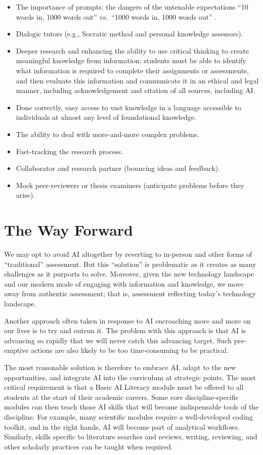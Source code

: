 \documentclass[
  10t,
]{article}
\providecommand{\tightlist}{%
  \setlength{\itemsep}{0pt}\setlength{\parskip}{0pt}}
\begin{document}
\begin{itemize}
\tightlist
\item
  The importance of prompts: the dangers of the untenable expectations
  ``10 words in, 1000 words out'' vs.~``1000 words in, 1000 words out''
  .
\item
  Dialogic tutors (e.g., Socratic method and personal knowledge
  assessors).
\item
  Deeper research and enhancing the ability to use critical thinking to
  create meaningful knowledge from information; students must be able to
  identify what information is required to complete their assignments or
  assessments, and then evaluate this information and communicate it in
  an ethical and legal manner, including acknowledgement and citation of
  all sources, including AI.
\item
  Done correctly, easy access to vast knowledge in a language accessible
  to individuals at almost any level of foundational knowledge.
\item
  The ability to deal with more-and-more complex problems.
\item
  Fast-tracking the research process.
\item
  Collaborator and research partner (bouncing ideas and feedback).
\item
  Mock peer-reviewers or thesis examiners (anticipate problems before
  they arise).
\end{itemize}

\section{The Way Forward}\label{the-way-forward}

We may opt to avoid AI altogether by reverting to in-person and other
forms of ``traditional'' assessment. But this ``solution'' is
problematic as it creates as many challenges as it purports to solve.
Moreover, given the new technology landscape and our modern mode of
engaging with information and knowledge, we move away from authentic
assessment; that is, assessment reflecting today's technology landscape.

Another approach often taken in response to AI encroaching more and more
on our lives is to try and outrun it. The problem with this approach is
that AI is advancing so rapidly that we will never catch this advancing
target. Such pre-emptive actions are also likely to be too
time-consuming to be practical.

The most reasonable solution is therefore to embrace AI, adapt to the
new opportunities, and integrate AI into the curriculum at strategic
points. The most critical requirement is that a Basic AI Literacy module
must be offered to all students at the start of their academic careers.
Some core discipline-specific modules can then teach those AI skills
that will become indispensable tools of the discipline. For example,
many scientific modules require a well-developed coding toolkit, and in
the right hands, AI will become part of analytical workflows. Similarly,
skills specific to literature searches and reviews, writing, reviewing,
and other scholarly practices can be taught when required.
\end{document}
